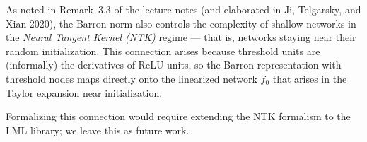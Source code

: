 \begin{remark}\label{rem:barronNTK}
As noted in Remark~3.3 of the lecture notes (and elaborated in Ji, Telgarsky, and Xian 2020),
the Barron norm also controls the complexity of shallow networks in the \emph{Neural Tangent
Kernel (NTK)} regime — that is, networks staying near their random initialization.
This connection arises because threshold units are (informally) the derivatives of ReLU
units, so the Barron representation with threshold nodes maps directly onto the linearized
network $f_0$ that arises in the Taylor expansion near initialization.

Formalizing this connection would require extending the NTK formalism to the LML library;
we leave this as future work.
\end{remark}
